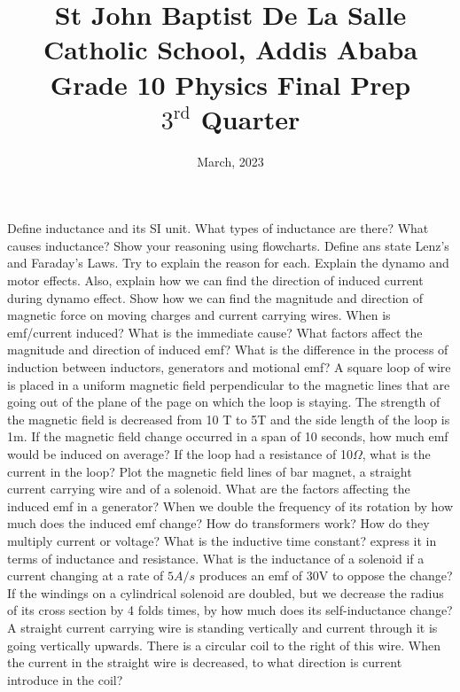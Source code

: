 \documentclass[12pt,addpoints]{exam}
\date{March, 2023}
\begin{document}
	\title{St John Baptist De La Salle Catholic School, Addis Ababa\\
		\large Grade 10 Physics Final Prep\\
		$3^\text{rd}$ Quarter}
	\maketitle
				\begin{questions}
					\question Define inductance and its SI unit. What types of inductance are there? What causes inductance? Show your reasoning using flowcharts.
					\question Define ans state Lenz's and Faraday's Laws. Try to explain the reason for each.
					\question Explain the dynamo and motor effects. Also, explain how we can find the direction of induced current during dynamo effect.
					\question Show how we can find the magnitude and direction of magnetic force on moving charges and current carrying wires.
					\question When is emf/current induced? What is the immediate cause? What factors affect the magnitude and direction of induced emf?
					\question What is the difference in the process of induction between inductors, generators and motional emf?
					\question A square loop of wire is placed in a uniform magnetic field perpendicular to the magnetic lines that are going out of the plane of the page on which the loop is staying. The strength of the magnetic field is decreased from 10 T to 5T and the side length of the loop is 1m. If the magnetic field change occurred in a span of 10 seconds, how much emf would be induced on average? If the loop had a resistance of 10$\Omega$, what is the current in the loop?
					\question Plot the magnetic field lines of bar magnet, a straight current carrying wire and of a solenoid.
					\question What are the factors affecting the induced emf in a  generator? When we double the frequency of its rotation by how much does the induced emf change?
					\question How do transformers work? How do they multiply current or voltage?
					\question What is the inductive time constant? express it in terms of inductance and resistance.
					\question What is the inductance of a solenoid if a current changing at a rate of $5A/s$ produces an emf of 30V to oppose the change?
					\question If the windings on a cylindrical solenoid are doubled, but we decrease the radius of its cross section by 4 folds times, by how much does its self-inductance change?
					\question A straight current carrying wire is standing vertically and current through it is going vertically upwards. There is a circular coil to the right of this wire. When the current in the straight wire is decreased, to what direction is current introduce in the coil?

\end{questions}
\end{document}
